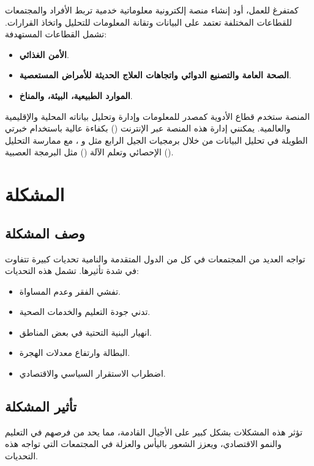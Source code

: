 \documentclass[12pt]{article}
\begin{document}
كمتفرغ للعمل، أود إنشاء منصة إلكترونية معلوماتية خدمية تربط الأفراد والمجتمعات للقطاعات المختلفة تعتمد على البيانات وتقانة المعلومات للتحليل واتخاذ القرارات.
تشمل القطاعات المستهدفة:
\begin{itemize}
    \item \textbf{الأمن الغذائي}.
    \item \textbf{الصحة العامة والتصنيع الدوائي واتجاهات العلاج الحديثة للأمراض المستعصية}.
    \item \textbf{الموارد الطبيعية، البيئة، والمناخ}.
\end{itemize}
المنصة ستخدم قطاع الأدوية كمصدر للمعلومات وإدارة وتحليل بياناته المحلية والإقليمية والعالمية. يمكنني إدارة هذه المنصة عبر الإنترنت () بكفاءة عالية باستخدام خبرتي الطويلة في تحليل البيانات من خلال برمجيات الجيل الرابع مثل  و ، مع ممارسة التحليل الإحصائي وتعلم الآلة () مثل البرمجة العصبية ().




\section {\textcolor{sectionColor}{المشكلة}}
\subsection*{\textcolor{sectionColor}{وصف المشكلة}}
تواجه العديد من المجتمعات في كل من الدول المتقدمة والنامية تحديات كبيرة تتفاوت في شدة تأثيرها. تشمل هذه التحديات:
\begin{itemize}
    \item تفشي الفقر وعدم المساواة.
    \item تدني جودة التعليم والخدمات الصحية.
    \item انهيار البنية التحتية في بعض المناطق.
    \item البطالة وارتفاع معدلات الهجرة.
    \item اضطراب الاستقرار السياسي والاقتصادي.
\end{itemize}

\subsection*{\textcolor{sectionColor}{تأثير المشكلة}}
تؤثر هذه المشكلات بشكل كبير على الأجيال القادمة، مما يحد من فرصهم في التعليم والنمو الاقتصادي، ويعزز الشعور باليأس والعزلة في المجتمعات التي تواجه هذه التحديات.
\end{document}
